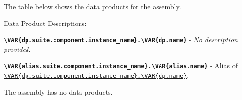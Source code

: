 The table below shows the data products for the  assembly.

{\renewcommand{\arraystretch}{2.2} %
}
\vspace{5mm} %

Data Product Descriptions:
\begin{spaceditemize}
  \item \textbf{\texttt{\url{\VAR{dp.suite.component.instance_name}.\VAR{dp.name}}}} -
    \textit{No description provided.}
  \item \textbf{\texttt{\url{\VAR{alias.suite.component.instance_name}.\VAR{alias.name}}}} -
    Alias of \texttt{\url{\VAR{dp.suite.component.instance_name}.\VAR{dp.name}}}.
\end{spaceditemize}
\vspace{5mm} %
\par The  assembly has no data products.
